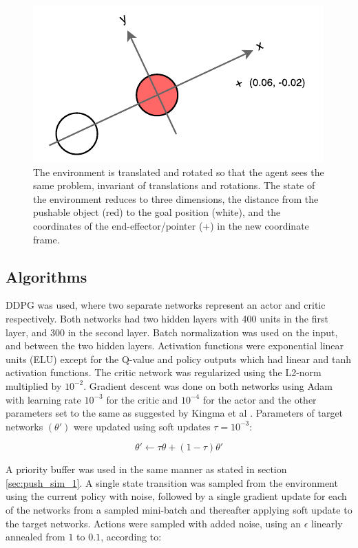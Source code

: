 \begin{figure}[h!]
    \centering
    \includegraphics[width=0.5 \textwidth]{res/ddpg-coordinates.pdf}

    \caption{The environment is translated and rotated so that the agent sees the same
    problem, invariant of translations and rotations. The state of the environment
    reduces to three dimensions, the distance from the pushable object (red) to the
    goal position (white), and the coordinates of the end-effector/pointer (+) in
    the new coordinate frame.}

    \label{fig:ddpg-coordinates}

\end{figure}

\subsection{Algorithms}

DDPG was used, where two separate networks represent an actor and critic
respectively. Both networks had two hidden layers with 400 units in the first
layer, and 300 in the second layer. Batch normalization was used on the input,
and between the two hidden layers. Activation functions were exponential linear
units (ELU) except for the Q-value and policy outputs which had linear and tanh
activation functions. The critic network was regularized using the L2-norm
multiplied by $10^{-2}$. Gradient descent was done on both networks using Adam
with learning rate $10^{-3}$ for the critic and $10^{-4}$ for the actor and the
other parameters set to the same as suggested by Kingma et al
\cite{kingma2014adam}. Parameters of target networks $(\theta')$ were updated
using soft updates $\tau = 10^{-3}$:

\begin{equation}
    \theta' \leftarrow \tau \theta + (1 - \tau) \theta'
\end{equation}

A priority buffer was used in the same manner as stated in section
\ref{sec:push_sim_1}. A single state transition was sampled from the
environment using the current policy with noise, followed by a single gradient
update for each of the networks from a sampled mini-batch and thereafter
applying soft update to the target networks. Actions were sampled with added
noise, using an $\epsilon$ linearly annealed from $1$ to $0.1$, according to:

